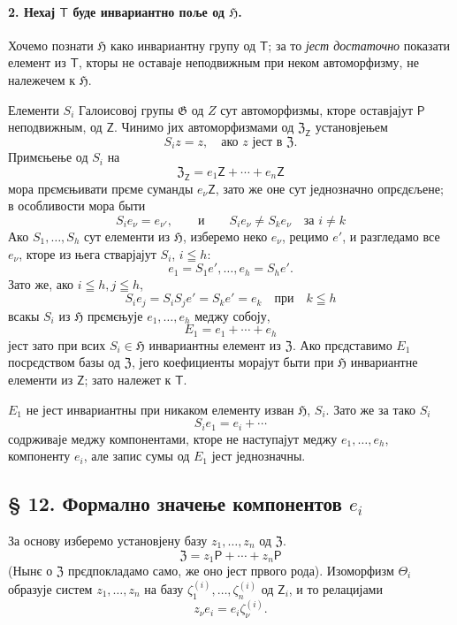 \documentclass[11pt]{article}
\begin{document}
\paragraph{2. Нехај \(\mathsf T\) буде инвариантно поље од \(\mathfrak H\).}
Хочемо познати \(\mathfrak H\) како инвариантну групу од \(\mathsf T\); за то \emph{јест достаточно} показати елемент из \(\mathsf T\), кторы не оставаје неподвижным при неком автоморфизму, не належечем к \(\mathfrak H\).

Елементи \(S_i\) Галоисовој групы \(\mathfrak G\) од \(Z\) сут автоморфизмы, кторе оставјајут \(\mathsf P\) неподвижным, од \(\mathsf Z\). Чинимо јих автоморфизмами од \(\mathfrak Z_{\mathsf Z}\) установјењем
\[
S_i z=z,\quad \text{ако } z \text{ јест в } \mathfrak Z.
\]
Примєњење од \(S_i\) на
\[
\mathfrak Z_{\mathsf Z}=e_1\mathsf Z+\cdots+e_n\mathsf Z
\]
мора прємєњивати прєме суманды \(e_\nu\mathsf Z\), зато же оне сут једнозначно опрєдєљене; в особливости мора быти
\[
S_i e_\nu=e_{\nu'},\qquad\text{и}\qquad S_i e_\nu\ne S_k e_\nu
\quad\text{за } i\ne k
\]
Ако \(S_1,\ldots,S_h\) сут елементи из \(\mathfrak H\), изберемо неко \(e_\nu\), рецимо \(e'\), и разгледамо все \(e_\nu\), кторе из њега стварјајут \(S_i\), \(i\leqq h\):
\[
e_1=S_1e',\ldots,e_h=S_he'.
\]
Зато же, ако \(i\leqq h, j\leqq h\),
\[
S_i e_j=S_iS_j e'=S_ke'=e_k \quad \text{при}\quad k\leqq h
\]
всакы \(S_i\) из \(\mathfrak H\) прємєњује \(e_1,\ldots,e_h\) меджу собоју,
\[
E_1=e_1+\cdots+e_h
\]
јест зато при всих \(S_i\in\mathfrak H\) инвариантны елемент из \(\mathfrak Z\). Ако прєдставимо \(E_1\) посрєдством базы од \(\mathfrak Z\), јего коефициенты морајут быти при \(\mathfrak H\) инвариантне елементи из \(\mathsf Z\); зато належет к \(\mathsf T\).

\(E_1\) не јест инвариантны при никаком елементу изван \(\mathfrak H\), \(S_i\). Зато же за тако \(S_i\)
\[
S_i e_1=e_i+\cdots
\]
содрживаје меджу компонентами, кторе не наступајут меджу \(e_1,\ldots,e_h\), компоненту \(e_i\), але запис сумы од \(E_1\) јест једнозначны.

\subsection*{§ 12. Формално значење компонентов \(e_i\)}\label{die-formale-bedeutung-der-komponenten-ei}

За основу изберемо установјену базу \(z_1,\ldots,z_n\) од \(\mathfrak Z\).
\[
\mathfrak Z=z_1\mathsf P+\cdots+z_n\mathsf P
\]
(Нынє о \(\mathfrak Z\) прєдпокладамо само, же оно јест првого рода). Изоморфизм \(\Theta_i\) образује систем \(z_1,\ldots,z_n\) на базу \(\zeta_1^{(i)},\ldots,\zeta_n^{(i)}\) од \(\mathsf Z_i\), и то релацијами
\[
z_\nu e_i=e_i\zeta_\nu^{(i)} .
\]
\end{document}
